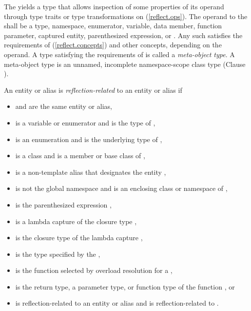 \begin{std.txt}\color{addclr}

    \pnum
    The  yields a type  that allows
    inspection of some properties of its operand through type traits or type
    transformations on  (\ref{reflect.ops}).  The operand to the
     shall be a type, namespace, enumerator,
    variable, data member, function parameter, captured
    entity, parenthesized expression,  or
    .  Any such  satisfies the requirements of
     (\ref{reflect.concepts}) and other 
    concepts, depending on the operand.  A type satisfying the requirements of
     is called a \emph{meta-object type}.  A meta-object
    type is an unnamed, incomplete namespace-scope class type (Clause ).

    \pnum
    An entity or alias  is \emph{reflection-related} to an entity or
    alias  if

    \begin{itemize}
      \item {} and  are the same entity or alias,
      \item {} is a variable or enumerator and  is the type of ,
      \item {} is an enumeration and  is the underlying type of ,
      \item {} is a class and  is a member or base class of ,
      \item {} is a non-template alias that designates the entity ,
      \item {} is not the global namespace and  is an enclosing class or namespace of ,
      \item {} is the parenthesized expression ,
      \item {} is a lambda capture of the closure type ,
      \item {} is the closure type of the lambda capture ,
      \item {} is the type specified by the  ,
      \item {} is the function selected by overload resolution for a  ,
      \item {} is the return type, a parameter type, or function type of the function , or
      \item {} is reflection-related to an entity or alias  and  is reflection-related to .
    \end{itemize}


\end{std.txt}
